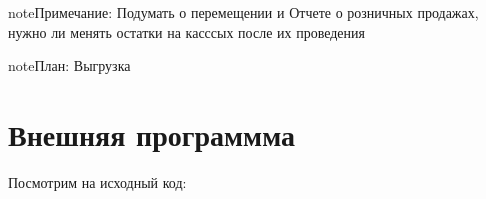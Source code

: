 \documentclass[letterpaper,10pt,russian]{sphinxmanual}
\begin{document}
\begin{sphinxadmonition}{note}{Примечание:}
\sphinxAtStartPar
Подумать о перемещении и Отчете о розничных продажах, нужно ли менять остатки на касссых после их проведения
\end{sphinxadmonition}

\begin{sphinxadmonition}{note}{\label{\detokenize{unf:id2}}План:}
\sphinxAtStartPar
Выгрузка
\end{sphinxadmonition}

\sphinxstepscope


\chapter{Внешняя программма}
\label{\detokenize{prox:id1}}\label{\detokenize{prox::doc}}
\sphinxAtStartPar
Посмотрим на исходный код:

\begin{sphinxVerbatim}[commandchars=\\\{\}]
 
      
           
          \PYG{p}{[}\PYG{p}{]}
        \PYG{p}{[}\PYG{p}{[}\PYG{p}{]}\PYG{p}{]}
\end{sphinxVerbatim}
\end{document}
